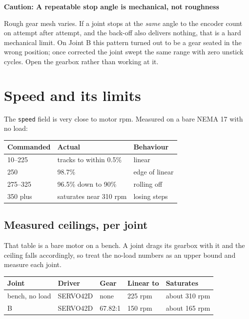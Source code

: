 \documentclass[11pt,letterpaper]{article}
\newenvironment{caution}[1]{%
    \par\addvspace{8pt}%
    \noindent{\color{cautionred}\rule{\linewidth}{0.8pt}}\par\vspace{2pt}
    \noindent\textbf{\color{cautionred}Caution: #1}\par\vspace{2pt}
}{%
    \par\vspace{2pt}\noindent{\color{cautionred}\rule{\linewidth}{0.4pt}}%
    \par\addvspace{8pt}%
}
\begin{document}
\begin{caution}{A repeatable stop angle is mechanical, not roughness}
Rough gear mesh varies. If a joint stops at the \emph{same} angle to the encoder
count on attempt after attempt, and the back-off also delivers nothing, that is a
hard mechanical limit. On Joint B this pattern turned out to be a gear seated in the
wrong position; once corrected the joint swept the same range with zero unstick
cycles. Open the gearbox rather than working at it.
\end{caution}

\section{Speed and its limits}

The \texttt{speed} field is very close to motor rpm. Measured on a bare NEMA 17 with
no load:

\begin{center}
\begin{tabular}{lll}
\toprule
\textbf{Commanded} & \textbf{Actual} & \textbf{Behaviour} \\ \midrule
10--225  & tracks to within 0.5\%      & linear \\
250      & 98.7\%                      & edge of linear \\
275--325 & 96.5\% down to 90\%         & rolling off \\
350 plus & saturates near 310 rpm      & losing steps \\
\bottomrule
\end{tabular}
\end{center}

\subsection{Measured ceilings, per joint}

That table is a bare motor on a bench. A joint drags its gearbox with it and the
ceiling falls accordingly, so treat the no-load numbers as an upper bound and
measure each joint.

\begin{center}
\begin{tabular}{lllll}
\toprule
\textbf{Joint} & \textbf{Driver} & \textbf{Gear} & \textbf{Linear to} & \textbf{Saturates} \\ \midrule
bench, no load & SERVO42D & none    & 225 rpm & about 310 rpm \\
B              & SERVO42D & 67.82:1 & 150 rpm & about 165 rpm \\
\bottomrule
\end{tabular}
\end{center}
\end{document}
